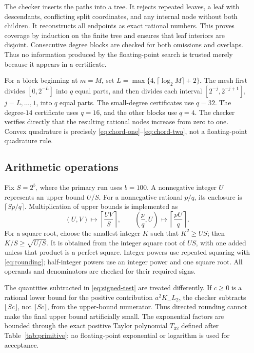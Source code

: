 \documentclass[11pt,reqno]{amsart}
\theoremstyle{definition}
\theoremstyle{remark}
\numberwithin{equation}{section}
\begin{document}
The checker inserts the paths into a tree. It rejects repeated leaves, a leaf with descendants, conflicting split coordinates, and any internal node without both children. It reconstructs all endpoints as exact rational numbers. This proves coverage by induction on the finite tree and ensures that leaf interiors are disjoint. Consecutive degree blocks are checked for both omissions and overlaps. Thus no information produced by the floating-point search is trusted merely because it appears in a certificate.

For a block beginning at $m=M$, set $L=\max\{4,\lceil\log_2M\rceil+2\}$. The mesh first divides $[0,2^{-L}]$ into $q$ equal parts, and then divides each interval $[2^{-j},2^{-j+1}]$, $j=L,\ldots,1$, into $q$ equal parts. The small-degree certificates use $q=32$. The degree-$14$ certificate uses $q=16$, and the other blocks use $q=4$. The checker verifies directly that the resulting rational nodes increase from zero to one. Convex quadrature is precisely \eqref{eq:chord-one}--\eqref{eq:chord-two}, not a floating-point quadrature rule.

\subsection{Arithmetic operations}

Fix $S=2^b$, where the primary run uses $b=100$. A nonnegative integer $U$ represents an upper bound $U/S$. For a nonnegative rational $p/q$, its enclosure is $\lceil Sp/q\rceil$. Multiplication of upper bounds is implemented as
\begin{equation}\label{eq:rounding}
 (U,V)\longmapsto\left\lceil\frac{UV}{S}\right\rceil,
 \qquad
 \left(\frac pq,U\right)\longmapsto
 \left\lceil\frac{pU}{q}\right\rceil.
\end{equation}
For a square root, choose the smallest integer $K$ such that $K^2\ge US$; then $K/S\ge\sqrt{U/S}$. It is obtained from the integer square root of $US$, with one added unless that product is a perfect square. Integer powers use repeated squaring with \eqref{eq:rounding}; half-integer powers use an integer power and one square root. All operands and denominators are checked for their required signs.

The quantities subtracted in \eqref{eq:signed-test} are treated differently. If $c\ge0$ is a rational lower bound for the positive contribution $a^2K_-L_2$, the checker subtracts $\lfloor Sc\rfloor$, not $\lceil Sc\rceil$, from the upper-bound numerator. Thus directed rounding cannot make the final upper bound artificially small. The exponential factors are bounded through the exact positive Taylor polynomial $T_{32}$ defined after Table~\ref{tab:primitive}; no floating-point exponential or logarithm is used for acceptance.
\end{document}
